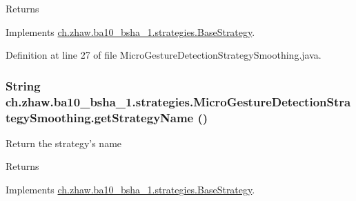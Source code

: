 \begin{DoxyReturn}{Returns}

\end{DoxyReturn}


Implements \hyperlink{classch_1_1zhaw_1_1ba10__bsha__1_1_1strategies_1_1BaseStrategy_a75fdb36932ad701f6375cc1fe718056b}{ch.zhaw.ba10\_\-bsha\_\-1.strategies.BaseStrategy}.

Definition at line 27 of file MicroGestureDetectionStrategySmoothing.java.\hypertarget{classch_1_1zhaw_1_1ba10__bsha__1_1_1strategies_1_1MicroGestureDetectionStrategySmoothing_aa12378131b9c311f0191934885c3345a}{
\subsubsection[{getStrategyName}]{\setlength{\rightskip}{0pt plus 5cm}String ch.zhaw.ba10\_\-bsha\_\-1.strategies.MicroGestureDetectionStrategySmoothing.getStrategyName ()}}
\label{classch_1_1zhaw_1_1ba10__bsha__1_1_1strategies_1_1MicroGestureDetectionStrategySmoothing_aa12378131b9c311f0191934885c3345a}
Return the strategy's name

\begin{DoxyReturn}{Returns}

\end{DoxyReturn}


Implements \hyperlink{classch_1_1zhaw_1_1ba10__bsha__1_1_1strategies_1_1BaseStrategy_aa0ebed55eed45409bad13d43a0058780}{ch.zhaw.ba10\_\-bsha\_\-1.strategies.BaseStrategy}.

